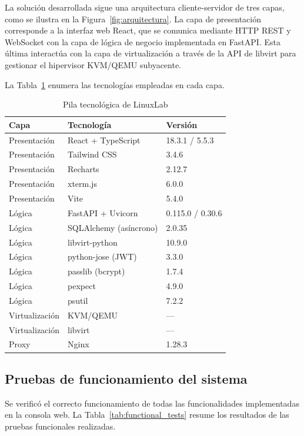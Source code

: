 La solución desarrollada sigue una arquitectura cliente-servidor de tres capas,
como se ilustra en la Figura~\ref{fig:arquitectura}. La capa de presentación
corresponde a la interfaz web React, que se comunica mediante HTTP REST y WebSocket
con la capa de lógica de negocio implementada en FastAPI. Esta última interactúa
con la capa de virtualización a través de la API de libvirt para gestionar el
hipervisor KVM/QEMU subyacente.

La Tabla~\ref{tab:tech_stack} enumera las tecnologías empleadas en cada capa.

\begin{table}[htbp]
\caption{Pila tecnológica de LinuxLab}
\label{tab:tech_stack}
\centering
\footnotesize
\begin{tabular}{p{2.5cm} p{3.5cm} p{3.5cm}}
\toprule
\textbf{Capa} & \textbf{Tecnología} & \textbf{Versión} \\
\midrule
Presentación & React + TypeScript & 18.3.1 / 5.5.3 \\
Presentación & Tailwind CSS & 3.4.6 \\
Presentación & Recharts & 2.12.7 \\
Presentación & xterm.js & 6.0.0 \\
Presentación & Vite & 5.4.0 \\
\midrule
Lógica & FastAPI + Uvicorn & 0.115.0 / 0.30.6 \\
Lógica & SQLAlchemy (asíncrono) & 2.0.35 \\
Lógica & libvirt-python & 10.9.0 \\
Lógica & python-jose (JWT) & 3.3.0 \\
Lógica & passlib (bcrypt) & 1.7.4 \\
Lógica & pexpect & 4.9.0 \\
Lógica & psutil & 7.2.2 \\
\midrule
Virtualización & KVM/QEMU & --- \\
Virtualización & libvirt & --- \\
Proxy & Nginx & 1.28.3 \\
\bottomrule
\end{tabular}
\end{table}

\subsection{Pruebas de funcionamiento del sistema}

Se verificó el correcto funcionamiento de todas las funcionalidades implementadas
en la consola web. La Tabla~\ref{tab:functional_tests} resume los resultados de
las pruebas funcionales realizadas.

